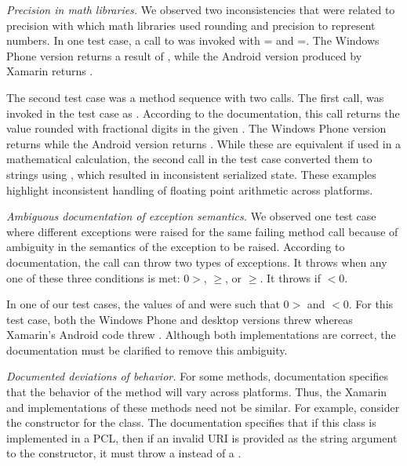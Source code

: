 \begin{mylist}
%
\item \textit{Precision in math libraries.} We observed two inconsistencies
that were related to precision with which math libraries used rounding and
precision to represent numbers. In one test case, a call to
 was invoked with
= and =.
The Windows Phone version returns a result of ,
while the Android version produced by Xamarin returns . 

The second test case was a method sequence with two calls. The first call,
 was
invoked in the test case as . According
to the documentation, this call returns the value  rounded with
 fractional digits in the given . The Windows Phone version
returns  while the Android version returns . While these
are equivalent if used in a mathematical calculation, the second call in the
test case converted them to strings using , which
resulted in inconsistent serialized state. These examples highlight
inconsistent handling of floating point arithmetic across platforms.

\item \textit{Ambiguous documentation of exception semantics.} We observed one
test case where different exceptions were raised for the same failing method
call because of ambiguity in the semantics of the exception to be raised.
According to documentation, the  call can throw two types of exceptions. It throws
 when any one of these three conditions is met:
0$>$, $\geqslant$, or
$\geqslant$. It throws
 if $<$0.

In one of our test cases, the values of  and  were such
that 0$>$ and $<$0. For this test case, both the Windows
Phone and desktop versions threw  whereas
Xamarin's Android code threw . Although both
implementations are correct, the documentation must be clarified to remove this
ambiguity.

\item \textit{Documented deviations of behavior.} For some methods,
documentation specifies that the behavior of the method will vary across
platforms. Thus, the Xamarin and  implementations of these methods
need not be similar.  For example, consider the constructor for the
 class. The documentation specifies that if this class is
implemented in a PCL, then if an invalid URI is provided as the string argument
to the constructor, it must throw a  instead of a
.


\end{mylist}
